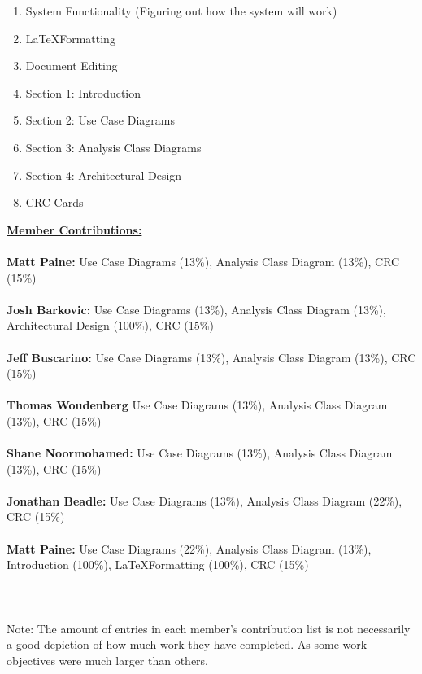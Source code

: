 \documentclass[12pt]{article}
\begin{document}
\begin{enumerate}
\item System Functionality (Figuring out how the system will work)
\item \LaTeX Formatting
\item Document Editing
\item Section 1: Introduction
\item Section 2: Use Case Diagrams
\item Section 3: Analysis Class Diagrams
\item Section 4: Architectural Design
\item CRC Cards
\end{enumerate}
\underline{\textbf{Member Contributions:}}\\
\\
\textbf{Matt Paine:} Use Case Diagrams (13\%), Analysis Class Diagram (13\%), CRC (15\%)\\ \\
\textbf{Josh Barkovic:} Use Case Diagrams (13\%), Analysis Class Diagram (13\%), Architectural Design (100\%), CRC (15\%)\\ \\
\textbf{Jeff Buscarino:} Use Case Diagrams (13\%), Analysis Class Diagram (13\%), CRC (15\%)\\ \\
\textbf{Thomas Woudenberg} Use Case Diagrams (13\%), Analysis Class Diagram (13\%), CRC (15\%)\\ \\
\textbf{Shane Noormohamed:} Use Case Diagrams (13\%), Analysis Class Diagram (13\%), CRC (15\%)\\ \\
\textbf{Jonathan Beadle:} Use Case Diagrams (13\%), Analysis Class Diagram (22\%), CRC (15\%)\\ \\
\textbf{Matt Paine:} Use Case Diagrams (22\%), Analysis Class Diagram (13\%), Introduction (100\%), \LaTeX Formatting (100\%), CRC (15\%)\\ \\
\\
\\
Note:
The amount of entries in each member’s contribution list is not necessarily a good depiction of how much work they have completed. As some work objectives were much larger than others.\newline
\end{document}
